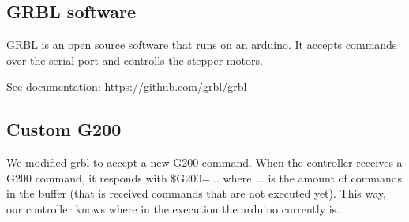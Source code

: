 \subsection{GRBL software}

GRBL is an open source software that runs on an arduino.
It accepts commands over the serial port and controlls the stepper motors.

See documentation: \url{https://github.com/grbl/grbl}

\subsection{Custom G200}

We modified grbl to accept a new G200 command.
When the controller receives a G200 command, it responds
with \$G200=... where ... is the amount of commands in the
buffer (that is received commands that are not executed yet).
This way, our controller knows where in the execution the arduino
currently is.
